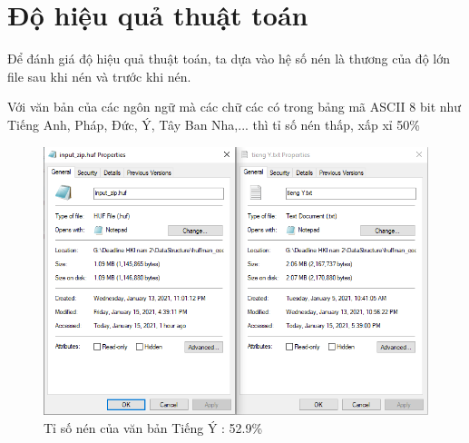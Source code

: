 \documentclass[14pt]{extreport}
\begin{document}
\section{Độ hiệu quả thuật toán}
Để đánh giá độ hiệu quả thuật toán, ta dựa vào hệ số nén là thương của độ lớn file sau khi nén và trước khi nén.

Với văn bản của các ngôn ngữ mà các chữ các có trong bảng mã ASCII 8 bit như Tiếng Anh, Pháp, Đức, Ý, Tây Ban Nha,... thì tỉ số nén thấp, xấp xỉ 50\%

\begin{center}
    \begin{figure}[H]
    \begin{center}
     \includegraphics[scale=1]{tisonen_TiengY.PNG}
    \end{center}
    \caption{Tỉ số nén của văn bản Tiếng Ý : 52.9\%}
    \label{refhinh1}
    \end{figure}
\end{center}
\end{document}
